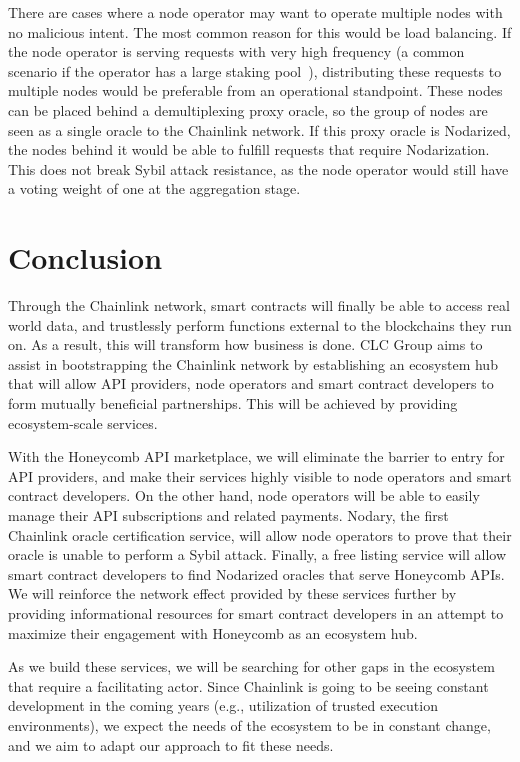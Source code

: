 \documentclass[12pt]{article}
\begin{document}
There are cases where a node operator may want to operate multiple nodes with no malicious intent.
The most common reason for this would be load balancing.
If the node operator is serving requests with very high frequency (a common scenario if the operator has a large staking pool~\cite{Huxtable:2018}), distributing these requests to multiple nodes would be preferable from an operational standpoint.
These nodes can be placed behind a demultiplexing proxy oracle, so the group of nodes are seen as a single oracle to the Chainlink network.
If this proxy oracle is Nodarized, the nodes behind it would be able to fulfill requests that require Nodarization.
This does not break Sybil attack resistance, as the node operator would still have a voting weight of one at the aggregation stage.


\section{Conclusion}
\label{sec:conclusion}

Through the Chainlink network, smart contracts will finally be able to access real world data, and trustlessly perform functions external to the blockchains they run on.
As a result, this will transform how business is done.
CLC Group aims to assist in bootstrapping the Chainlink network by establishing an ecosystem hub that will allow API providers, node operators and smart contract developers to form mutually beneficial partnerships.
This will be achieved by providing ecosystem-scale services.

With the Honeycomb API marketplace, we will eliminate the barrier to entry for API providers, and make their services highly visible to node operators and smart contract developers.
On the other hand, node operators will be able to easily manage their API subscriptions and related payments.
Nodary, the first Chainlink oracle certification service, will allow node operators to prove that their oracle is unable to perform a Sybil attack.
Finally, a free listing service will allow smart contract developers to find Nodarized oracles that serve Honeycomb APIs.
We will reinforce the network effect provided by these services further by providing informational resources for smart contract developers in an attempt to maximize their engagement with Honeycomb as an ecosystem hub.

As we build these services, we will be searching for other gaps in the ecosystem that require a facilitating actor.
Since Chainlink is going to be seeing constant development in the coming years (e.g., utilization of trusted execution environments), we expect the needs of the ecosystem to be in constant change, and we aim to adapt our approach to fit these needs.



\end{document}
